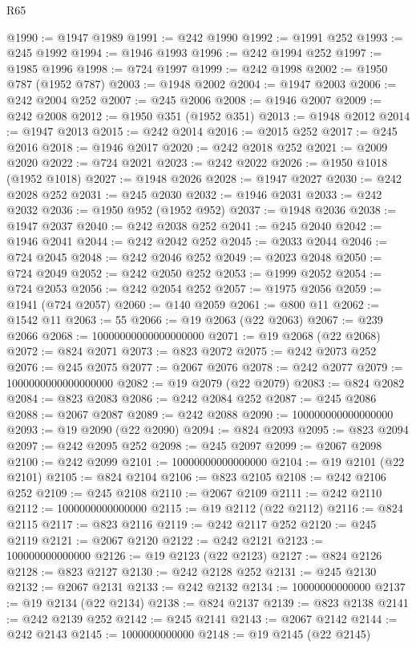 \begin{lexlean}{R65}
\begin{coremodule}
{@1990 := @1947 @1989
@1991 := @242 @1990
@1992 := @1991 @252
@1993 := @245 @1992
@1994 := @1946 @1993
@1996 := @242 @1994 @252
@1997 := @1985 @1996
@1998 := @724 @1997
@1999 := @242 @1998
@2002 := @1950 @787 (@1952 @787)
@2003 := @1948 @2002
@2004 := @1947 @2003
@2006 := @242 @2004 @252
@2007 := @245 @2006
@2008 := @1946 @2007
@2009 := @242 @2008
@2012 := @1950 @351 (@1952 @351)
@2013 := @1948 @2012
@2014 := @1947 @2013
@2015 := @242 @2014
@2016 := @2015 @252
@2017 := @245 @2016
@2018 := @1946 @2017
@2020 := @242 @2018 @252
@2021 := @2009 @2020
@2022 := @724 @2021
@2023 := @242 @2022
@2026 := @1950 @1018 (@1952 @1018)
@2027 := @1948 @2026
@2028 := @1947 @2027
@2030 := @242 @2028 @252
@2031 := @245 @2030
@2032 := @1946 @2031
@2033 := @242 @2032
@2036 := @1950 @952 (@1952 @952)
@2037 := @1948 @2036
@2038 := @1947 @2037
@2040 := @242 @2038 @252
@2041 := @245 @2040
@2042 := @1946 @2041
@2044 := @242 @2042 @252
@2045 := @2033 @2044
@2046 := @724 @2045
@2048 := @242 @2046 @252
@2049 := @2023 @2048
@2050 := @724 @2049
@2052 := @242 @2050 @252
@2053 := @1999 @2052
@2054 := @724 @2053
@2056 := @242 @2054 @252
@2057 := @1975 @2056
@2059 := @1941 (@724 @2057)
@2060 := @140 @2059
@2061 := @800 @11
@2062 := @1542 @11
@2063 := 55
@2066 := @19 @2063 (@22 @2063)
@2067 := @239 @2066
@2068 := 10000000000000000000
@2071 := @19 @2068 (@22 @2068)
@2072 := @824 @2071
@2073 := @823 @2072
@2075 := @242 @2073 @252
@2076 := @245 @2075
@2077 := @2067 @2076
@2078 := @242 @2077
@2079 := 1000000000000000000
@2082 := @19 @2079 (@22 @2079)
@2083 := @824 @2082
@2084 := @823 @2083
@2086 := @242 @2084 @252
@2087 := @245 @2086
@2088 := @2067 @2087
@2089 := @242 @2088
@2090 := 100000000000000000
@2093 := @19 @2090 (@22 @2090)
@2094 := @824 @2093
@2095 := @823 @2094
@2097 := @242 @2095 @252
@2098 := @245 @2097
@2099 := @2067 @2098
@2100 := @242 @2099
@2101 := 10000000000000000
@2104 := @19 @2101 (@22 @2101)
@2105 := @824 @2104
@2106 := @823 @2105
@2108 := @242 @2106 @252
@2109 := @245 @2108
@2110 := @2067 @2109
@2111 := @242 @2110
@2112 := 1000000000000000
@2115 := @19 @2112 (@22 @2112)
@2116 := @824 @2115
@2117 := @823 @2116
@2119 := @242 @2117 @252
@2120 := @245 @2119
@2121 := @2067 @2120
@2122 := @242 @2121
@2123 := 100000000000000
@2126 := @19 @2123 (@22 @2123)
@2127 := @824 @2126
@2128 := @823 @2127
@2130 := @242 @2128 @252
@2131 := @245 @2130
@2132 := @2067 @2131
@2133 := @242 @2132
@2134 := 10000000000000
@2137 := @19 @2134 (@22 @2134)
@2138 := @824 @2137
@2139 := @823 @2138
@2141 := @242 @2139 @252
@2142 := @245 @2141
@2143 := @2067 @2142
@2144 := @242 @2143
@2145 := 1000000000000
@2148 := @19 @2145 (@22 @2145)
}
\end{coremodule}
\end{lexlean}

